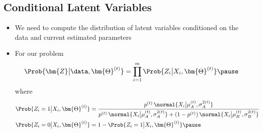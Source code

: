 
\begin{slide}
\section[-1]{Conditional Latent Variables}

\begin{PauseHighLight}
  \begin{itemize}
  \item We need to compute the distribution of latent variables
    conditioned on the data and current estimated parameters\pause
  \item For our problem
    \begin{align*}
      \Prob{\bm{Z}\big|\data,\bm{\Theta}^{(t)}} =
      \prod_{i=1}^m \Prob{Z_i\big|X_i,\bm{\Theta}^{(t)}}\pause
    \end{align*}
    where{\small
    \begin{align*}
      \Prob{Z_i=1\big|X_i,\bm{\Theta}^{(t)}} &= \frac{p^{(t)}\,
      \normal{X_i\big|\mu_A^{(t)},\sigma_A^{2(t)}} } 
     { p^{(t)}\,\normal{X_i\big|\mu_A^{(t)},\sigma_A^{2(t)}} +
     (1-p^{(t)})\, \normal{X_i\big|\mu_B^{(t)},\sigma_B^{2(t)}} } \\
      \Prob{Z_i=0\big|X_i,\bm{\Theta}^{(t)}} &= 1 -
      \Prob{Z_i=1\big|X_i,\bm{\Theta}^{(t)}}\pause
    \end{align*}}
  \end{itemize}
\end{PauseHighLight}


\end{slide}




